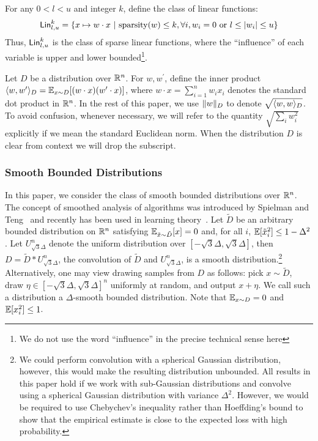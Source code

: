 For any $0 < l < u$ and integer $k$, define the class of linear functions:
\[
\mathsf{Lin}^k_{l, u} = \{ x \mapsto w \cdot x ~|~ \mathrm{sparsity}(w) \leq k, \forall i,
w_i = 0 \mbox{ or } l \leq |w_i| \leq u \}
\]
Thus, $\mathsf{Lin}^k_{l, u}$ is the class of sparse linear functions, where the
``influence'' of each variable is upper and lower bounded\footnote{We do not use
the word ``influence'' in the precise technical sense here}.

Let $D$ be a distribution over $\mathbb{R}^n$. For $w, w^\prime$, define the inner
product $\langle w, w^\prime \rangle_D = \mathbb{E}_{x \sim D}[(w \cdot x) (w^\prime \cdot x)]$,
where $w \cdot x = \sum_{i = 1}^n w_i x_i$ denotes the standard dot product
in $\mathbb{R}^n$. In the rest of this paper, we use $\Vert w \Vert_D$ to denote
$\sqrt{\langle w, w \rangle_D}$. To avoid confusion, whenever necessary, we
will refer to the quantity $\sqrt{\sum_{i} w_i^2}$ explicitly if we mean the standard
Euclidean norm. When the distribution $D$ is clear from context we will drop
the subscript.

\subsubsection*{Smooth Bounded Distributions}

In this paper, we consider the class of smooth bounded distributions over
$\mathbb{R}^n$. The concept of smoothed analysis of algorithms was introduced by
Spielman and Teng~\cite{ST:2001} and recently has been used in learning
theory~\cite{KST:2009,KKM:2013}.  Let $\tilde{D}$ be an arbitrary bounded
distribution on $\mathbb{R}^n$ satisfying $\mathbb{E}_{\tilde{x} \sim \tilde{D}}[x]=0$ and,
for all $i$, $\mathbb{E}[\tilde{x}_i^2] \leq 1 - \Delta^2$.  Let
$U^n_{\sqrt{3}\Delta}$ denote the uniform distribution over $[-\sqrt{3} \Delta,
\sqrt{3}\Delta]$, then $D = \tilde{D}* U^n_{\sqrt{3} \Delta}$, the
convolution of $\tilde{D}$ and $U^n_{\sqrt{3}\Delta}$, is a smooth
distribution.\footnote{We could perform convolution with a spherical
Gaussian distribution, however, this would make the resulting distribution
unbounded. All results in this paper hold if we work with sub-Gaussian
distributions and convolve using a spherical Gaussian distribution with variance
$\Delta^2$. However, we would be required to use Chebychev's inequality
rather than Hoeffding's bound to show that the empirical estimate is close to
the expected loss with high probability.} Alternatively, one may view drawing
samples from $D$ as follows: pick $x \sim \tilde{D}$, draw $\eta \in [-\sqrt{3}
\Delta, \sqrt{3} \Delta]^n$ uniformly at random, and output $x + \eta$. We call
such a distribution a $\Delta$-smooth bounded distribution. Note that $\mathbb{E}_{x
\sim D} = 0$ and $\mathbb{E}[x_i^2] \leq 1$.

